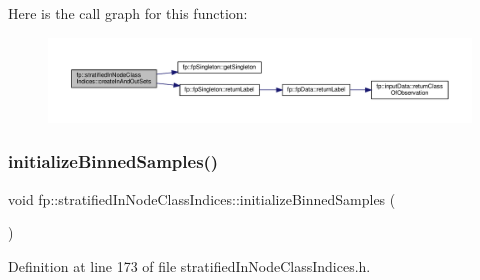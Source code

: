 Here is the call graph for this function\+:
\nopagebreak
\begin{figure}[H]
\begin{center}
\leavevmode
\includegraphics[width=350pt]{classfp_1_1stratifiedInNodeClassIndices_a64bc290a78f3800cef41d42ebe64ff1b_cgraph}
\end{center}
\end{figure}
\mbox{\label{classfp_1_1stratifiedInNodeClassIndices_ae9907f8984615f91417fb7961e1b582d}} 
\subsubsection{\texorpdfstring{initialize\+Binned\+Samples()}{initializeBinnedSamples()}}
{\footnotesize\ttfamily void fp\+::stratified\+In\+Node\+Class\+Indices\+::initialize\+Binned\+Samples (\begin{DoxyParamCaption}{ }\end{DoxyParamCaption})\hspace{0.3cm}{\ttfamily [inline]}}



Definition at line 173 of file stratified\+In\+Node\+Class\+Indices.\+h.



